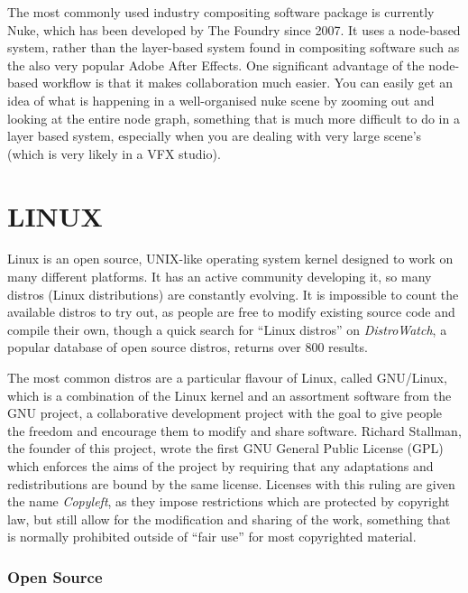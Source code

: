 The most commonly used industry compositing software package is currently Nuke, which has been developed by The Foundry since 2007. It uses a node-based system, rather than the layer-based system found in compositing software such as the also very popular Adobe After Effects. One significant advantage of the node-based workflow is that it makes collaboration much easier. You can easily get an idea of what is happening in a well-organised nuke scene by zooming out and looking at the entire node graph, something that is much more difficult to do in a layer based system, especially when you are dealing with very large scene's (which is very likely in a VFX studio).

\pagebreak\hypertarget{linux}{%
\section{LINUX}\label{linux}}

Linux is an open source, UNIX-like operating system kernel designed to work on many different platforms. It has an active community developing it, so many distros (Linux distributions) are constantly evolving. It is impossible to count the available distros to try out, as people are free to modify existing source code and compile their own, though a quick search for ``Linux distros'' on \emph{DistroWatch}, a popular database of open source distros, returns over 800 results.

The most common distros are a particular flavour of Linux, called GNU/Linux, which is a combination of the Linux kernel and an assortment software from the GNU project, a collaborative development project with the goal to give people the freedom and encourage them to modify and share software. Richard Stallman, the founder of this project, wrote the first GNU General Public License (GPL) which enforces the aims of the project by requiring that any adaptations and redistributions are bound by the same license. Licenses with this ruling are given the name \emph{Copyleft}, as they impose restrictions which are protected by copyright law, but still allow for the modification and sharing of the work, something that is normally prohibited outside of ``fair use'' for most copyrighted material.

\hypertarget{open-source}{%
\subsubsection{Open Source}\label{open-source}}

